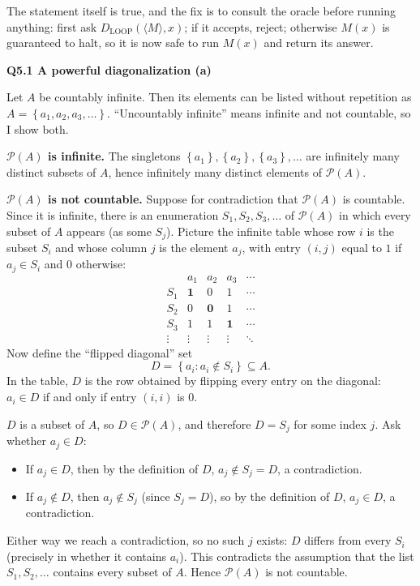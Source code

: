 \documentclass[11pt]{article}
\newcommand{\set}[1]{\left\{#1\right\}}
\newcommand{\inner}[1]{\langle #1 \rangle}
\newcommand{\PS}{\mathcal{P}}
\newcommand{\qpage}[1]{\clearpage\noindent\textbf{\large #1}\par\medskip}
\begin{document}
The statement itself is true, and the fix is to consult the oracle before running anything: first ask $D_{\text{LOOP}}(\inner{M}, x)$; if it accepts, reject; otherwise $M(x)$ is guaranteed to halt, so it is now safe to run $M(x)$ and return its answer.

\qpage{Q5.1 A powerful diagonalization (a)}

Let $A$ be countably infinite.
Then its elements can be listed without repetition as $A = \set{a_1, a_2, a_3, \ldots}$.
``Uncountably infinite'' means infinite and not countable, so I show both.

\textbf{$\PS(A)$ is infinite.}
The singletons $\set{a_1}, \set{a_2}, \set{a_3}, \ldots$ are infinitely many distinct subsets of $A$, hence infinitely many distinct elements of $\PS(A)$.

\textbf{$\PS(A)$ is not countable.}
Suppose for contradiction that $\PS(A)$ is countable.
Since it is infinite, there is an enumeration $S_1, S_2, S_3, \ldots$ of $\PS(A)$ in which every subset of $A$ appears (as some $S_j$).
Picture the infinite table whose row $i$ is the subset $S_i$ and whose column $j$ is the element $a_j$, with entry $(i,j)$ equal to $1$ if $a_j \in S_i$ and $0$ otherwise:
\[
  \begin{array}{c|cccc}
         & a_1 & a_2 & a_3 & \cdots \\ \hline
    S_1  & \mathbf{1} & 0 & 1 & \cdots \\
    S_2  & 0 & \mathbf{0} & 1 & \cdots \\
    S_3  & 1 & 1 & \mathbf{1} & \cdots \\
    \vdots & \vdots & \vdots & \vdots & \ddots
  \end{array}
\]
Now define the ``flipped diagonal'' set
\[
  D = \set{a_i : a_i \notin S_i} \subseteq A.
\]
In the table, $D$ is the row obtained by flipping every entry on the diagonal: $a_i \in D$ if and only if entry $(i,i)$ is $0$.

$D$ is a subset of $A$, so $D \in \PS(A)$, and therefore $D = S_j$ for some index $j$.
Ask whether $a_j \in D$:
\begin{itemize}
  \item If $a_j \in D$, then by the definition of $D$, $a_j \notin S_j = D$, a contradiction.
  \item If $a_j \notin D$, then $a_j \notin S_j$ (since $S_j = D$), so by the definition of $D$, $a_j \in D$, a contradiction.
\end{itemize}
Either way we reach a contradiction, so no such $j$ exists: $D$ differs from every $S_i$ (precisely in whether it contains $a_i$).
This contradicts the assumption that the list $S_1, S_2, \ldots$ contains every subset of $A$.
Hence $\PS(A)$ is not countable.
\end{document}
